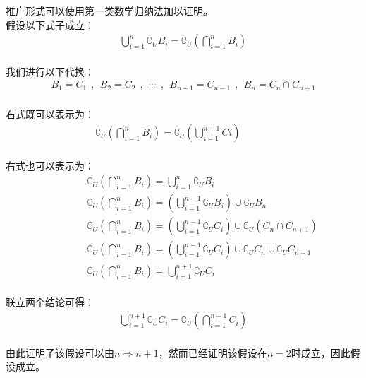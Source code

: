 \documentclass[UTF8]{ctexart}
\begin{document}
\newpage

    推广形式可以使用第一类数学归纳法加以证明。\\[3mm]
    假设以下式子成立：
    \setcounter{equation}{0}
    \begin{align}
        \bigcup_{i=1}^n \complement_UB_i=\complement_U\left(\bigcap_{i=1}^n B_i\right)
    \end{align}\\
    我们进行以下代换：
    \begin{align}
        B_1=C_1~~,~~B_2=C_2~~,~~\cdots~~,~~B_{n-1}=C_{n-1}~~,~~B_n=C_n\cap C_{n+1}
    \end{align}\\
    右式既可以表示为：
    \begin{align}
        \complement_U\left(\bigcap_{i=1}^n B_i\right)=\complement_U\left(\bigcup_{i=1}^{n+1}Ci\right)~~~~~~~~~~~~~~
    \end{align}\\
    右式也可以表示为：
    \begin{align}
        &~~~~~~~~~~~~~~\complement_U\left(\bigcap_{i=1}^n B_i\right)=\bigcup_{i=1}^n\complement_U B_i\\[3mm]
        &~~~~~~~~~~~~~~\complement_U\left(\bigcap_{i=1}^n B_i\right)=\left(\bigcup_{i=1}^{n-1}\complement_U B_i\right)\cup\complement_U B_n\\[3mm]
        &~~~~~~~~~~~~~~\complement_U\left(\bigcap_{i=1}^n B_i\right)=\left(\bigcup_{i=1}^{n-1}\complement_U C_i\right)\cup\complement_U\left(C_n\cap C_{n+1}\right)\\[3mm]
        &~~~~~~~~~~~~~~\complement_U\left(\bigcap_{i=1}^n B_i\right)=\left(\bigcup_{i=1}^{n-1}\complement_U C_i\right)\cup\complement_UC_n\cup \complement_UC_{n+1}\\[3mm]
        &~~~~~~~~~~~~~~\complement_U\left(\bigcap_{i=1}^n B_i\right)=\bigcup_{i=1}^{n+1}\complement_U C_i
    \end{align}\\
    联立两个结论可得：
    \begin{align}
        \bigcup_{i=1}^{n+1} \complement_UC_i=\complement_U\left(\bigcap_{i=1}^{n+1} C_i\right)
    \end{align}\\
    由此证明了该假设可以由$n\Rightarrow n+1$，然而已经证明该假设在$n=2$时成立，因此假设成立。

\newpage
\end{document}
